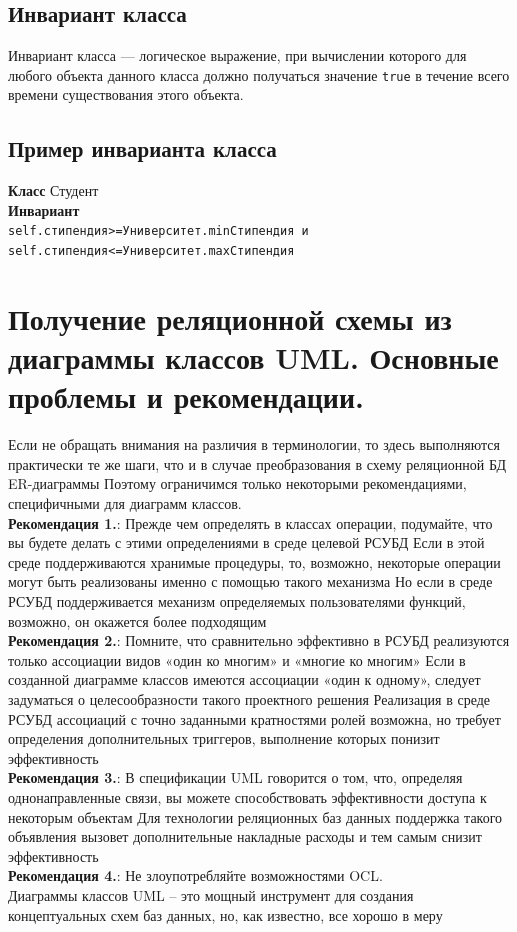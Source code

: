 \documentclass[a4paper,12pt]{article}
\begin{document}
\subsection{Инвариант класса}

Инвариант класса — логическое выражение, при вычислении которого для любого объекта данного класса должно получаться значение \texttt{true} в течение всего времени существования этого объекта.

\subsection{Пример инварианта класса}

\textbf{Класс} 
Студент \\
\textbf{Инвариант} \\
\texttt{self.стипендия>=Университет.minСтипендия и self.стипендия<=Университет.maxСтипендия} \\

\section{Получение реляционной схемы из диаграммы классов UML. Основные проблемы и рекомендации.}
Если не обращать внимания на различия в терминологии, то
здесь выполняются практически те же шаги, что и в случае
преобразования в схему реляционной БД ER-диаграммы
Поэтому ограничимся только некоторыми рекомендациями,
специфичными для диаграмм классов.
\\
\textbf{Рекомендация 1.}: Прежде чем определять в классах
операции, подумайте, что вы будете делать с этими
определениями в среде целевой РСУБД
Если в этой среде поддерживаются хранимые процедуры, то,
возможно, некоторые операции могут быть реализованы
именно с помощью такого механизма
Но если в среде РСУБД поддерживается механизм
определяемых пользователями функций, возможно, он
окажется более подходящим 
\\
\textbf{Рекомендация 2.}: Помните, что сравнительно
эффективно в РСУБД реализуются только
ассоциации видов «один ко многим» и «многие
ко многим»
Если в созданной диаграмме классов имеются
ассоциации «один к одному», следует задуматься о
целесообразности такого проектного решения
Реализация в среде РСУБД ассоциаций с точно
заданными кратностями ролей возможна, но требует
определения дополнительных триггеров, выполнение
которых понизит эффективность
\\
\textbf{Рекомендация 3.}: В спецификации UML говорится
о том, что, определяя однонаправленные связи,
вы можете способствовать эффективности
доступа к некоторым объектам
Для технологии реляционных баз данных поддержка
такого объявления вызовет дополнительные накладные
расходы и тем самым снизит эффективность
\\
\textbf{Рекомендация 4.}: Не злоупотребляйте
возможностями OCL.
\\
Диаграммы классов UML – это мощный
инструмент для создания концептуальных схем
баз данных, но, как известно, все хорошо в меру
\end{document}

